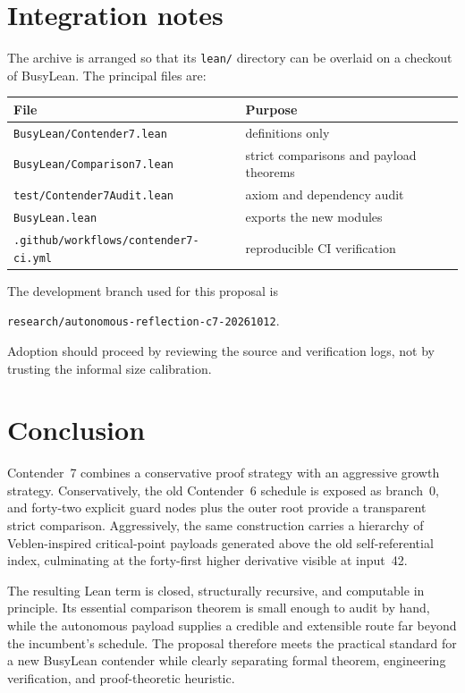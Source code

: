 \documentclass[11pt]{article}
\theoremstyle{definition}
\theoremstyle{remark}
\newcommand{\lean}[1]{\texttt{#1}}
\begin{document}
\section{Integration notes}

The archive is arranged so that its \lean{lean/} directory can be overlaid on a
checkout of BusyLean.  The principal files are:

\begin{center}
\begin{tabular}{ll}
\toprule
File & Purpose\\
\midrule
\lean{BusyLean/Contender7.lean} & definitions only\\
\lean{BusyLean/Comparison7.lean} & strict comparisons and payload theorems\\
\lean{test/Contender7Audit.lean} & axiom and dependency audit\\
\lean{BusyLean.lean} & exports the new modules\\
\lean{.github/workflows/contender7-ci.yml} & reproducible CI verification\\
\bottomrule
\end{tabular}
\end{center}

The development branch used for this proposal is
\begin{center}
\lean{research/autonomous-reflection-c7-20261012}.
\end{center}
Adoption should proceed by reviewing the source and verification logs, not by
trusting the informal size calibration.

\section{Conclusion}

Contender~7 combines a conservative proof strategy with an aggressive growth
strategy.  Conservatively, the old Contender~6 schedule is exposed as branch~0,
and forty-two explicit guard nodes plus the outer root provide a transparent
strict comparison.  Aggressively, the same construction carries a hierarchy of
Veblen-inspired critical-point payloads generated above the old self-referential
index, culminating at the forty-first higher derivative visible at input~42.

The resulting Lean term is closed, structurally recursive, and computable in
principle.  Its essential comparison theorem is small enough to audit by hand,
while the autonomous payload supplies a credible and extensible route far
beyond the incumbent's schedule.  The proposal therefore meets the practical
standard for a new BusyLean contender while clearly separating formal theorem,
engineering verification, and proof-theoretic heuristic.
\end{document}
